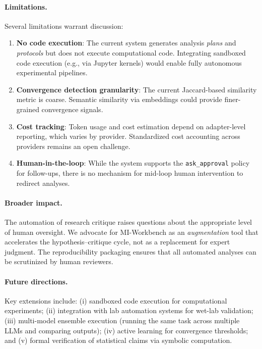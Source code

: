 \documentclass[11pt,a4paper]{article}
\begin{document}
\paragraph{Limitations.}
Several limitations warrant discussion:
\begin{enumerate}[leftmargin=*]
  \item \textbf{No code execution}: The current system generates analysis \emph{plans} and \emph{protocols} but does not execute computational code.
  Integrating sandboxed code execution (e.g., via Jupyter kernels) would enable fully autonomous experimental pipelines.
  \item \textbf{Convergence detection granularity}: The current Jaccard-based similarity metric is coarse.
  Semantic similarity via embeddings could provide finer-grained convergence signals.
  \item \textbf{Cost tracking}: Token usage and cost estimation depend on adapter-level reporting, which varies by provider.
  Standardized cost accounting across providers remains an open challenge.
  \item \textbf{Human-in-the-loop}: While the system supports the \texttt{ask\_approval} policy for follow-ups, there is no mechanism for mid-loop human intervention to redirect analyses.
\end{enumerate}

\paragraph{Broader impact.}
The automation of research critique raises questions about the appropriate level of human oversight.
We advocate for MI-Workbench as an \emph{augmentation} tool that accelerates the hypothesis--critique cycle, not as a replacement for expert judgment.
The reproducibility packaging ensures that all automated analyses can be scrutinized by human reviewers.

\paragraph{Future directions.}
Key extensions include: (i) sandboxed code execution for computational experiments; (ii) integration with lab automation systems for wet-lab validation; (iii) multi-model ensemble execution (running the same task across multiple LLMs and comparing outputs); (iv) active learning for convergence thresholds; and (v) formal verification of statistical claims via symbolic computation.
\end{document}
